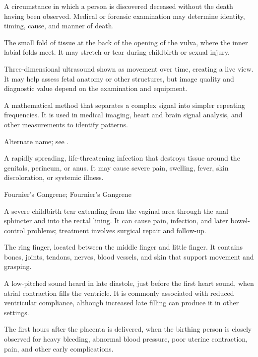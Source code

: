 A circumstance in which a person is discovered deceased without the death having been observed. Medical or forensic examination may determine identity, timing, cause, and manner of death.

 The small fold of tissue at the back of the opening of the vulva, where the inner labial folds meet. It may stretch or tear during childbirth or sexual injury.

 Three-dimensional ultrasound shown as movement over time, creating a live view. It may help assess fetal anatomy or other structures, but image quality and diagnostic value depend on the examination and equipment.

 A mathematical method that separates a complex signal into simpler repeating frequencies. It is used in medical imaging, heart and brain signal analysis, and other measurements to identify patterns.

 Alternate name; see .

 A rapidly spreading, life-threatening infection that destroys tissue around the genitals, perineum, or anus. It may cause severe pain, swelling, fever, skin discoloration, or systemic illness.

\synonyms
Fournier's Gangrene; Fournier’s Gangrene

 A severe childbirth tear extending from the vaginal area through the anal sphincter and into the rectal lining. It can cause pain, infection, and later bowel-control problems; treatment involves surgical repair and follow-up.

 The ring finger, located between the middle finger and little finger. It contains bones, joints, tendons, nerves, blood vessels, and skin that support movement and grasping.

 A low-pitched sound heard in late diastole, just before the first heart sound, when atrial contraction fills the ventricle. It is commonly associated with reduced ventricular compliance, although increased late filling can produce it in other settings.

 The first hours after the placenta is delivered, when the birthing person is closely observed for heavy bleeding, abnormal blood pressure, poor uterine contraction, pain, and other early complications.

